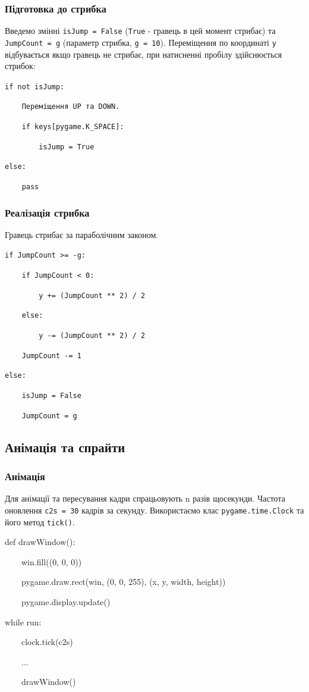 \begin{frame}
\frametitle{Підготовка до стрибка}
Введемо змінні \texttt{isJump = False} (\texttt{True} - гравець в цей момент стрибає) та \texttt{JumpCount = g} (параметр стрибка, \texttt{g = 10}). Переміщення по координаті \texttt{y} відбувається якщо гравець не стрибає, при натисненні пробілу здійснюється стрибок:  

\texttt{if not isJump:}

\texttt{~~~~Переміщення UP та DOWN.}  
      
\texttt{~~~~if keys[pygame.K\_SPACE]:}

\texttt{~~~~~~~~isJump = True}

\texttt{else:}

\texttt{~~~~pass}
        
\end{frame}

\begin{frame}
\frametitle{Реалізація стрибка}
Гравець стрибає за параболічним законом. 

\texttt{if JumpCount >= -g:}

\texttt{~~~~if JumpCount < 0:}

\texttt{~~~~~~~~y += (JumpCount ** 2) / 2}

\texttt{~~~~else:}

\texttt{~~~~~~~~y -= (JumpCount ** 2) / 2}

\texttt{~~~~JumpCount -= 1}

\texttt{else:}

\texttt{~~~~isJump = False}

\texttt{~~~~JumpCount = g}        
\end{frame}

\subsection{Анімація та спрайти}

\begin{frame}
\frametitle{Анімація}
Для анімації та пересування кадри спрацьовують n разів щосекунди. Частота оновлення  \texttt{c2s = 30} кадрів за секунду. Використаємо клас \texttt{pygame.time.Clock} та його метод \texttt{tick()}.

def drawWindow():

~~~~win.fill((0, 0, 0))

~~~~pygame.draw.rect(win, (0, 0, 255), (x, y, width, height))

~~~~pygame.display.update()

while run:

~~~~clock.tick(c2s)

~~~~...

~~~~drawWindow()

\end{frame}

